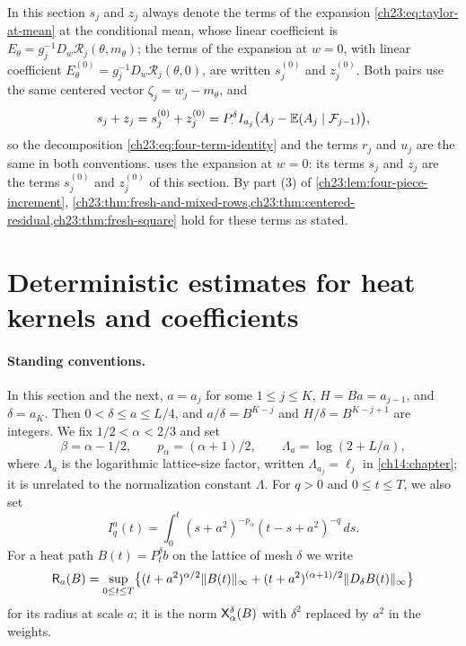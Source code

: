 \begin{remark}\label{ch23:rem:base-point}
In this section $s_j$ and $z_j$ always denote the terms of the expansion \eqref{ch23:eq:taylor-at-mean} at the conditional mean, whose linear coefficient is $E_\theta=g_j^{-1}D_w\mathscr R_j(\theta,m_\theta)$; the terms of the expansion at $w=0$, with linear coefficient $E_\theta^{(0)}=g_j^{-1}D_w\mathscr R_j(\theta,0)$, are written $s_j^{(0)}$ and $z_j^{(0)}$. Both pairs use the same centered vector $\zeta_j=w_j-m_\theta$, and
\[
 s_j+z_j=s_j^{(0)}+z_j^{(0)}=P_\cdot^\delta I_{a_j}\bigl(A_j-\mathbb E(A_j\mid\mathcal F_{j-1})\bigr),
\]
so the decomposition \eqref{ch23:eq:four-term-identity} and the terms $r_j$ and $u_j$ are the same in both conventions.  uses the expansion at $w=0$: its terms $s_j$ and $z_j$ are the terms $s_j^{(0)}$ and $z_j^{(0)}$ of this section. By part (3) of \cref{ch23:lem:four-piece-increment}, \cref{ch23:thm:fresh-and-mixed-rows,ch23:thm:centered-residual,ch23:thm:fresh-square} hold for these terms as stated.
\end{remark}

\section{Deterministic estimates for heat kernels and coefficients}\label{ch23:sec:deterministic}

\paragraph{Standing conventions.}
In this section and the next, $a=a_j$ for some $1\le j\le K$, $H=Ba=a_{j-1}$, and $\delta=a_K$. Then $0<\delta\le a\le L/4$, and $a/\delta=B^{K-j}$ and $H/\delta=B^{K-j+1}$ are integers. We fix $1/2<\alpha<2/3$ and set
\[
 \beta=\alpha-1/2,\qquad p_\alpha=(\alpha+1)/2,\qquad \Lambda_a=\log(2+L/a),
\]
where $\Lambda_a$ is the logarithmic lattice-size factor, written $\Lambda_{a_j}=\ell_j$ in \cref{ch14:chapter}; it is unrelated to the normalization constant $\Lambda$. For $q>0$ and $0\le t\le T$, we also set
\begin{equation}\label{ch23:eq:convolution-profile}
 I_q^a(t)=\int_0^t(s+a^2)^{-p_\alpha}(t-s+a^2)^{-q}\,ds.
\end{equation}
For a heat path $B(t)=P_t^\delta b$ on the lattice of mesh $\delta$ we write
\begin{equation}\label{ch23:eq:background-radius}
 \mathsf R_a(B)=\sup_{0\le t\le T}\bigl\{(t+a^2)^{\alpha/2}\lVert B(t)\rVert_\infty+(t+a^2)^{(\alpha+1)/2}\lVert D_\delta B(t)\rVert_\infty\bigr\}
\end{equation}
for its radius at scale $a$; it is the norm $\mathsf X_{\alpha}^{\delta}(B)$ with $\delta^2$ replaced by $a^2$ in the weights.


